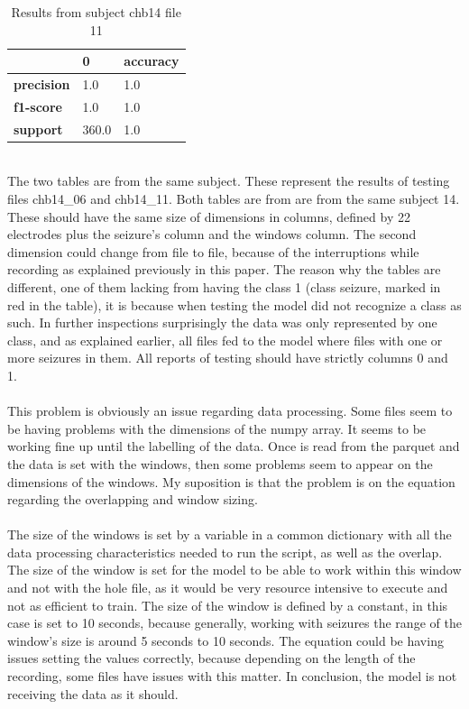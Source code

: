 \begin{table}[H]
    \centering
    \caption{Results from subject chb14 file 11}
    \begin{tabular}{|l|l|l|}
        \hline
                        & \textbf{0} & \textbf{accuracy} \\ \hline
        \textbf{precision} & 1.0        & 1.0               \\ \hline
        \textbf{f1-score}  & 1.0        & 1.0               \\ \hline
        \textbf{support}   & 360.0      & 1.0               \\ \hline
    \end{tabular}
\end{table}
\leavevmode\\
The two tables are from the same subject. These represent the results of testing files chb14\_06 and chb14\_11. Both tables are from are from the same subject 14. These should have the same size of dimensions in columns, defined by 22 electrodes plus the seizure’s column and the windows column. The second dimension could change from file to file, because of the interruptions while recording as explained previously in this paper. The reason why the tables are different, one of them lacking from having the class 1 (class seizure, marked in red in the table), it is because when testing the model did not recognize a class as such. In further inspections surprisingly the data was only represented by one class, and as explained earlier, all files fed to the model where files with one or more seizures in them. All reports of testing should have strictly columns 0 and 1.
\\\\
This problem is obviously an issue regarding data processing. Some files seem to be having problems with the dimensions of the numpy array. It seems to be working fine up until the labelling of the data. Once is read from the parquet and the data is set with the windows, then some problems seem to appear on the dimensions of the windows. My suposition is that the problem is on the equation regarding the overlapping and window sizing.
\\\\
The size of the windows is set by a variable in a common dictionary with all the data processing characteristics needed to run the script, as well as the overlap. The size of the window is set for the model to be able to work within this window and not with the hole file, as it would be very resource intensive to execute and not as efficient to train. The size of the window is defined by a constant, in this case is set to 10 seconds, because generally, working with seizures the range of the window’s size is around 5 seconds to 10 seconds. The equation could be having issues setting the values correctly, because depending on the length of the recording, some files have issues with this matter. In conclusion, the model is not receiving the data as it should.
\leavevmode\\


